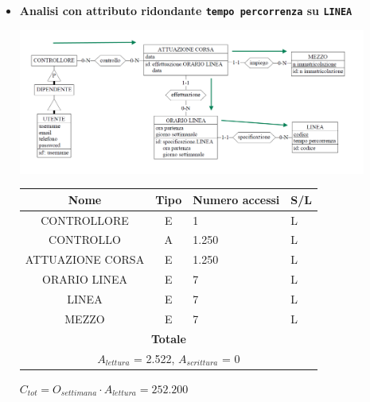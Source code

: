 \documentclass[12pt,a4paper]{report}
\begin{document}
\begin{enumerate}[label=\textbf{\arabic*)}]
    \begin{itemize}
    \item \textbf{Analisi con attributo ridondante \texttt{tempo percorrenza} su \texttt{LINEA}}
    \begin{center}
    \includegraphics[width=0.9\textwidth]{VisualOrarioControlloriRid}
    \end{center}
    \begin{table}[H]
    \centering
    \begin{tabular}{|c|c|l|l|}
    \hline
    \textbf{Nome} & \textbf{Tipo} & \textbf{Numero accessi} & \textbf{S/L} \\
    \hline
    CONTROLLORE & E & 1 & L \\
    \hline
    CONTROLLO & A & 1.250 & L \\
    \hline
    ATTUAZIONE CORSA & E & 1.250 & L \\
    \hline
    ORARIO LINEA & E & 7 & L \\
    \hline
    LINEA & E & 7 & L \\
    \hline
    MEZZO & E & 7 & L \\
   \hline
    \multicolumn{4}{c}{\textbf{Totale}} \\
    \multicolumn{4}{c}{${A_{lettura}}$ = 2.522, ${A_{scrittura}}$ = 0} \\
    \hline
    \end{tabular}
    \end{table}
    \begin{center}
    ${C_{tot} = {O_{settimana}}\cdot{A_{lettura}}= 252.200}$
    \end{center}


\end{itemize}
\end{enumerate}
\end{document}
